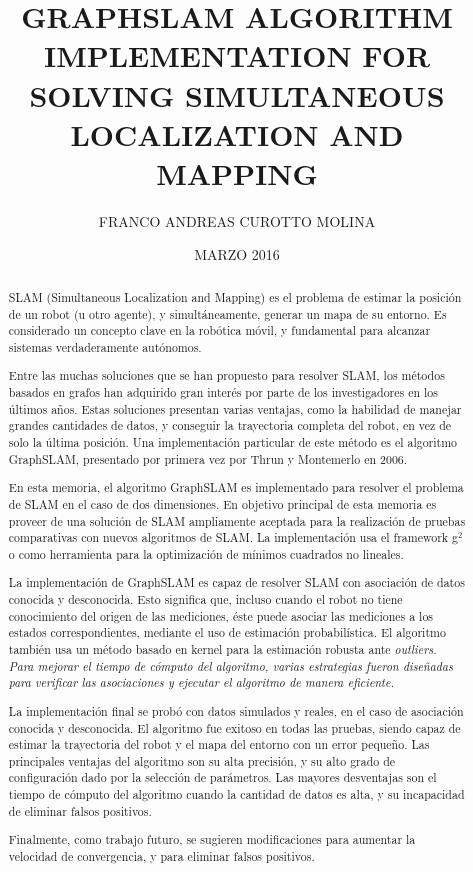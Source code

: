 \documentclass[upright, contnum]{umemoria}
\author{FRANCO ANDREAS CUROTTO MOLINA}
\title{GRAPHSLAM ALGORITHM IMPLEMENTATION FOR SOLVING SIMULTANEOUS LOCALIZATION AND MAPPING}
\date{MARZO 2016}
\begin{document}
\frontmatter
\maketitle

\begin{abstract}
SLAM (Simultaneous Localization and Mapping) es el problema de estimar la posición de un robot (u otro agente), y simultáneamente, generar un mapa de su entorno. Es considerado un concepto clave en la robótica móvil, y fundamental para alcanzar sistemas verdaderamente autónomos.

Entre las muchas soluciones que se han propuesto para resolver SLAM, los métodos basados en grafos han adquirido gran interés por parte de los investigadores en los últimos años. Estas soluciones presentan varias ventajas, como la habilidad de manejar grandes cantidades de datos, y conseguir la trayectoria completa del robot, en vez de solo la última posición. Una implementación particular de este método es el algoritmo GraphSLAM, presentado por primera vez por Thrun y Montemerlo en 2006.  

En esta memoria, el algoritmo GraphSLAM es implementado para resolver el problema de SLAM en el caso de dos dimensiones. En objetivo principal de esta memoria es proveer de una solución de SLAM ampliamente aceptada para la realización de pruebas comparativas con nuevos algoritmos de SLAM. La implementación usa el framework g$^2$o como herramienta para la optimización de mínimos cuadrados no lineales.

La implementación de GraphSLAM es capaz de resolver SLAM con asociación de datos conocida y desconocida. Esto significa que, incluso cuando el robot no tiene conocimiento del origen de las mediciones, éste puede asociar las mediciones a los estados correspondientes, mediante el uso de estimación probabilística. El algoritmo también usa un método basado en kernel para la estimación robusta ante \it{outliers}. Para mejorar el tiempo de cómputo del algoritmo, varias estrategias fueron diseñadas para verificar las asociaciones y ejecutar el algoritmo de manera eficiente. 

La implementación final se probó con datos simulados y reales, en el caso de asociación conocida y desconocida. El algoritmo fue exitoso en todas las pruebas, siendo capaz de estimar la trayectoria del robot y el mapa del entorno con un error pequeño. Las principales ventajas del algoritmo son su alta precisión, y su alto grado de configuración dado por la selección de parámetros. Las mayores desventajas son el tiempo de cómputo del algoritmo cuando la cantidad de datos es alta, y su incapacidad de eliminar falsos positivos.  

Finalmente, como trabajo futuro, se sugieren modificaciones para aumentar la velocidad de convergencia, y para eliminar falsos positivos.
\end{abstract}
\end{document}
